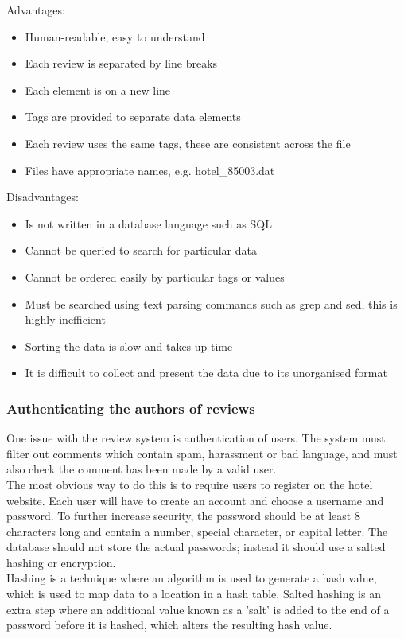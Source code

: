 \documentclass[12pt]{article}
\begin{document}
Advantages: 
\begin{itemize}
\item
Human-readable, easy to understand 
\item 
Each review is separated by line breaks 
\item 
Each element is on a new line 
\item 
Tags are provided to separate data elements 
\item 
Each review uses the same tags, these are consistent across the file 
\item
Files have appropriate names, e.g. hotel\_85003.dat 
\end{itemize}

Disadvantages: 
\begin{itemize}
\item 
Is not written in a database language such as SQL 
\item
Cannot be queried to search for particular data 
\item
Cannot be ordered easily by particular tags or values 
\item
Must be searched using text parsing commands such as grep and sed, this is highly inefficient 
\item
Sorting the data is slow and takes up time 
\item
It is difficult to collect and present the data due to its unorganised format 
\end{itemize}

\newpage
\subsubsection{Authenticating the authors of reviews}

One issue with the review system is authentication of users. The system must filter out comments which contain spam, harassment or bad language, and must also check the comment has been made by a valid user. \\

The most obvious way to do this is to require users to register on the hotel website. Each user will have to create an account and choose a username and password. To further increase security, the password should be at least 8 characters long and contain a number, special character, or capital letter. The database should not store the actual passwords; instead it should use a salted hashing or encryption. \\

Hashing is a technique where an algorithm is used to generate a hash value, which is used to map data to a location in a hash table. Salted hashing is an extra step where an additional value known as a 'salt' is added to the end of a password before it is hashed, which alters the resulting hash value. \\
\end{document}
